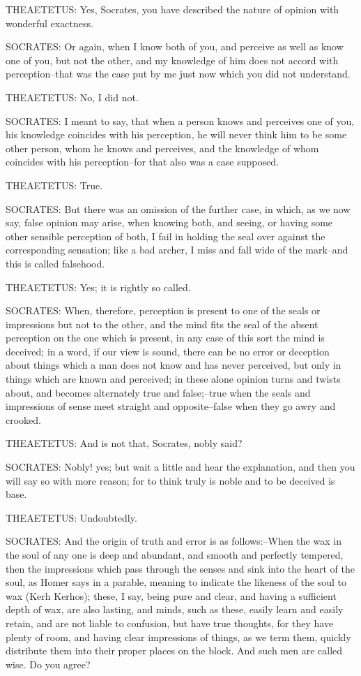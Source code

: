 THEAETETUS: Yes, Socrates, you have described the nature of opinion with
wonderful exactness.

SOCRATES: Or again, when I know both of you, and perceive as well as
know one of you, but not the other, and my knowledge of him does not
accord with perception--that was the case put by me just now which you
did not understand.

THEAETETUS: No, I did not.

SOCRATES: I meant to say, that when a person knows and perceives one of
you, his knowledge coincides with his perception, he will never think
him to be some other person, whom he knows and perceives, and the
knowledge of whom coincides with his perception--for that also was a
case supposed.

THEAETETUS: True.

SOCRATES: But there was an omission of the further case, in which, as
we now say, false opinion may arise, when knowing both, and seeing, or
having some other sensible perception of both, I fail in holding the
seal over against the corresponding sensation; like a bad archer, I miss
and fall wide of the mark--and this is called falsehood.

THEAETETUS: Yes; it is rightly so called.

SOCRATES: When, therefore, perception is present to one of the seals
or impressions but not to the other, and the mind fits the seal of the
absent perception on the one which is present, in any case of this sort
the mind is deceived; in a word, if our view is sound, there can be no
error or deception about things which a man does not know and has never
perceived, but only in things which are known and perceived; in these
alone opinion turns and twists about, and becomes alternately true and
false;--true when the seals and impressions of sense meet straight and
opposite--false when they go awry and crooked.

THEAETETUS: And is not that, Socrates, nobly said?

SOCRATES: Nobly! yes; but wait a little and hear the explanation, and
then you will say so with more reason; for to think truly is noble and
to be deceived is base.

THEAETETUS: Undoubtedly.

SOCRATES: And the origin of truth and error is as follows:--When the wax
in the soul of any one is deep and abundant, and smooth and perfectly
tempered, then the impressions which pass through the senses and sink
into the heart of the soul, as Homer says in a parable, meaning to
indicate the likeness of the soul to wax (Kerh Kerhos); these, I say,
being pure and clear, and having a sufficient depth of wax, are also
lasting, and minds, such as these, easily learn and easily retain,
and are not liable to confusion, but have true thoughts, for they have
plenty of room, and having clear impressions of things, as we term them,
quickly distribute them into their proper places on the block. And such
men are called wise. Do you agree?

